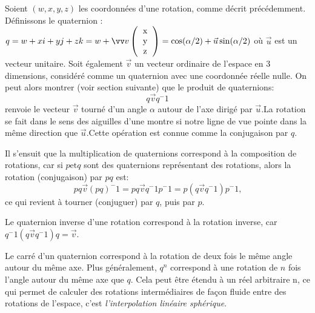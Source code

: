 Soient $(w, x, y, z)$ les coordonnées d'une rotation, comme décrit précédemment. 
Définissons le quaternion : $q = w + xi + yj+ zk = w + \vvv{v}{x}{y}{z} = 
\cos( \alpha / 2 ) + \vec{u} \sin( \alpha/2 )$
où $\vec{u}$ est un vecteur unitaire. Soit également $\vec{v}$ un vecteur
ordinaire de l'espace en 3 dimensions, considéré comme un quaternion avec
une coordonnée réelle nulle. On peut alors montrer (voir section suivante) 
que le produit de quaternions: 
\[
q\vec{v}q^-1
\]
renvoie le vecteur $\vec{v}$ tourné d'un angle $\alpha$ autour de l'axe dirigé
par $\vec{u}$.La rotation se fait dans le sens des aiguilles d'une montre 
si notre ligne de vue pointe dans la même direction que $\vec{u}$.Cette opération 
est connue comme la conjugaison par $q$.

Il s'ensuit que la multiplication de quaternions correspond à la composition de 
rotations, car si $p \text{et} q$ sont des quaternions représentant des rotations, 
alors la rotation (conjugaison) par $pq$ est:
\[
pq\vec{v}( pq )^-1 = pq\vec{v}q^-1p^-1 = p( q\vec{v}q^-1 )p^-1 \text{,}
\]
ce qui revient à tourner (conjuguer) par $q$, puis par $p$.

Le quaternion inverse d'une rotation correspond à la rotation inverse, car
$q^-1( q\vec{v}q^-1 )q = \vec{v}$.

Le carré d'un quaternion correspond à la 
rotation de deux fois le même angle autour du même axe. Plus généralement, 
$q^n$ correspond à une rotation de $n$ fois l'angle autour du même axe que $q$.
Cela peut être étendu à un réel arbitraire n, ce qui permet de calculer des rotations intermédiaires de façon fluide entre des rotations de l'espace, c'est
\emph{l'interpolation linéaire sphérique}.